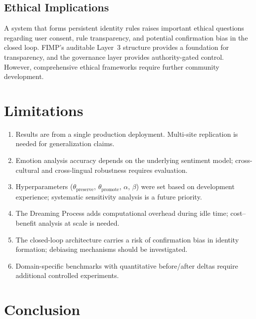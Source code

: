 \documentclass[11pt,a4paper]{article}
\begin{document}
\subsection{Ethical Implications}

A system that forms persistent identity rules raises important ethical questions regarding user consent, rule transparency, and potential confirmation bias in the closed loop. FIMP's auditable Layer~3 structure provides a foundation for transparency, and the governance layer provides authority-gated control. However, comprehensive ethical frameworks require further community development.

\section{Limitations}

\begin{enumerate}[leftmargin=*, itemsep=3pt]
  \item Results are from a single production deployment. Multi-site replication is needed for generalization claims.
  \item Emotion analysis accuracy depends on the underlying sentiment model; cross-cultural and cross-lingual robustness requires evaluation.
  \item Hyperparameters ($\theta_{\text{preserve}}$, $\theta_{\text{promote}}$, $\alpha$, $\beta$) were set based on development experience; systematic sensitivity analysis is a future priority.
  \item The Dreaming Process adds computational overhead during idle time; cost--benefit analysis at scale is needed.
  \item The closed-loop architecture carries a risk of confirmation bias in identity formation; debiasing mechanisms should be investigated.
  \item Domain-specific benchmarks with quantitative before/after deltas require additional controlled experiments.
\end{enumerate}

\section{Conclusion}
\end{document}

